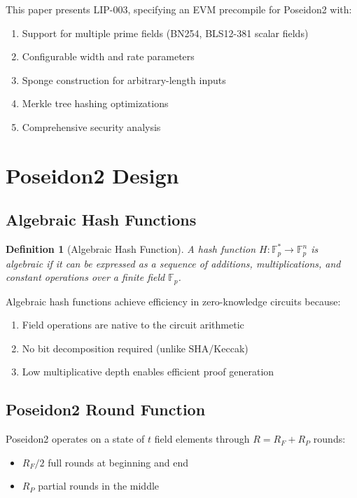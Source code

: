 \documentclass[11pt,a4paper]{article}
\newtheorem{definition}{Definition}
\begin{document}
This paper presents LIP-003, specifying an EVM precompile for Poseidon2 with:

\begin{enumerate}
    \item Support for multiple prime fields (BN254, BLS12-381 scalar fields)
    \item Configurable width and rate parameters
    \item Sponge construction for arbitrary-length inputs
    \item Merkle tree hashing optimizations
    \item Comprehensive security analysis
\end{enumerate}

\section{Poseidon2 Design}

\subsection{Algebraic Hash Functions}

\begin{definition}[Algebraic Hash Function]
A hash function $H: \mathbb{F}_p^* \to \mathbb{F}_p^n$ is algebraic if it can be expressed as a sequence of additions, multiplications, and constant operations over a finite field $\mathbb{F}_p$.
\end{definition}

Algebraic hash functions achieve efficiency in zero-knowledge circuits because:
\begin{enumerate}
    \item Field operations are native to the circuit arithmetic
    \item No bit decomposition required (unlike SHA/Keccak)
    \item Low multiplicative depth enables efficient proof generation
\end{enumerate}

\subsection{Poseidon2 Round Function}

Poseidon2 operates on a state of $t$ field elements through $R = R_F + R_P$ rounds:
\begin{itemize}
    \item $R_F/2$ full rounds at beginning and end
    \item $R_P$ partial rounds in the middle
\end{itemize}
\end{document}
